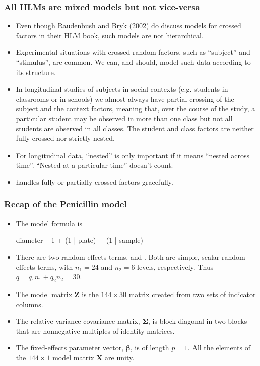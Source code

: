 \begin{frame}[fragile]
  \frametitle{All HLMs are mixed models but not vice-versa}
  \begin{itemize}
  \item Even though Raudenbush and Bryk (2002) do discuss models for
    crossed factors in their HLM book, such models are not
    hierarchical.
  \item Experimental situations with crossed random factors, such as
    ``subject'' and ``stimulus'', are common.  We can, and should, model
    such data according to its structure.
  \item In longitudinal studies of subjects in social contexts (e.g.
    students in classrooms or in schools) we almost always have partial
    crossing of the subject and the context factors, meaning that, over
    the course of the study, a particular student may be observed in
    more than one class but not all students are
    observed in all classes.  The student and class factors are
    neither fully crossed nor strictly nested.  
  \item For longitudinal data, ``nested'' is only important if it means
    ``nested across time''.  ``Nested at a particular time'' doesn't
    count.
  \item {} handles fully or partially crossed factors gracefully.
  \end{itemize}
\end{frame}

\begin{frame}[fragile]
  \frametitle{Recap of the Penicillin model}
  \begin{itemize}
  \item The model formula is
\begin{Schunk}
\begin{Soutput}
diameter ~ 1 + (1 | plate) + (1 | sample)
\end{Soutput}
\end{Schunk}
\item There are two random-effects terms,  and
  .  Both are simple, scalar random effects terms,
  with $n_1=24$ and $n_2=6$ levels, respectively.  Thus
  $q=q_1n_1+q_2n_2=30$.
\item The model matrix $\bm Z$ is the $144\times 30$ matrix created
  from two sets of indicator columns.
\item The relative variance-covariance matrix, $\bm\Sigma$, is block
  diagonal in two blocks that are nonnegative multiples of identity
  matrices.
\item The fixed-effects parameter vector, $\bm\beta$, is of length
  $p=1$.  All the elements of the $144\times 1$ model matrix $\bm X$
  are unity.
\end{itemize}
\end{frame}

